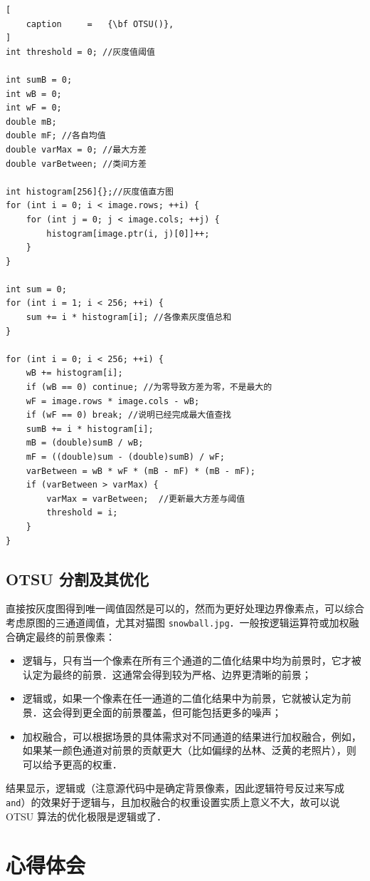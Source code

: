 \documentclass[12pt,a4paper,twoside]{ctexart}
\numberwithin{figure}{section}
\numberwithin{equation}{section}
\begin{document}
\begin{lstlisting}[
    caption     =   {\bf OTSU()},
]
int threshold = 0; //灰度值阈值

int sumB = 0;
int wB = 0;
int wF = 0;
double mB;
double mF; //各自均值
double varMax = 0; //最大方差
double varBetween; //类间方差

int histogram[256]{};//灰度值直方图
for (int i = 0; i < image.rows; ++i) {
    for (int j = 0; j < image.cols; ++j) {
        histogram[image.ptr(i, j)[0]]++;
    }
}

int sum = 0;
for (int i = 1; i < 256; ++i) {
    sum += i * histogram[i]; //各像素灰度值总和
}

for (int i = 0; i < 256; ++i) {
    wB += histogram[i];
    if (wB == 0) continue; //为零导致方差为零，不是最大的
    wF = image.rows * image.cols - wB;
    if (wF == 0) break; //说明已经完成最大值查找
    sumB += i * histogram[i];
    mB = (double)sumB / wB;
    mF = ((double)sum - (double)sumB) / wF;
    varBetween = wB * wF * (mB - mF) * (mB - mF);
    if (varBetween > varMax) {
        varMax = varBetween;  //更新最大方差与阈值
        threshold = i;
    }
}
\end{lstlisting}

\subsection{OTSU 分割及其优化}\label{sec:OTSUseg}
直接按灰度图得到唯一阈值固然是可以的，然而为更好处理边界像素点，可以综合考虑原图的三通道阈值，尤其对猫图 \verb|snowball.jpg|．一般按逻辑运算符或加权融合确定最终的前景像素：
\begin{itemize}
    \item 逻辑与，只有当一个像素在所有三个通道的二值化结果中均为前景时，它才被认定为最终的前景．这通常会得到较为严格、边界更清晰的前景；
    \item 逻辑或，如果一个像素在任一通道的二值化结果中为前景，它就被认定为前景．这会得到更全面的前景覆盖，但可能包括更多的噪声；
    \item 加权融合，可以根据场景的具体需求对不同通道的结果进行加权融合，例如，如果某一颜色通道对前景的贡献更大（比如偏绿的丛林、泛黄的老照片），则可以给予更高的权重．
\end{itemize}
结果显示，逻辑或（注意源代码中是确定背景像素，因此逻辑符号反过来写成 \verb|and|）的效果好于逻辑与，且加权融合的权重设置实质上意义不大，故可以说 OTSU 算法的优化极限是逻辑或了．


\newpage
\section{心得体会}
\end{document}
